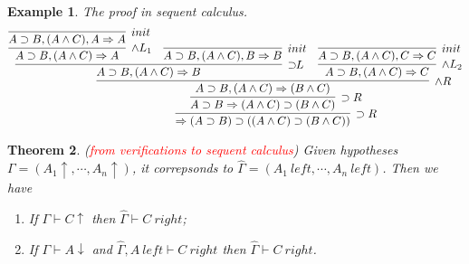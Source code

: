 \documentclass{article}
\theoremstyle{plain}
\newtheorem{theorem}{Theorem}
\newtheorem{example}[theorem]{Example}
\theoremstyle{nonumberplain}
\newcommand{\redt}[1]{\textcolor{red}{#1}}
\begin{document}
\begin{example}
\rm The proof in sequent calculus.
$$
\infer[\supset R]{\Rightarrow (A \supset B) \supset ((A\wedge C) \supset (B \wedge C) ) }{\infer[\supset R]{A \supset B \Rightarrow (A\wedge C) \supset (B \wedge C)}{\infer[\wedge R]{A \supset B,(A\wedge C) \Rightarrow  (B \wedge C)}{\infer[\supset\!\! L]{A \supset B,(A\wedge C) \Rightarrow B}{\infer[\wedge L_1]{A \supset B,(A\wedge C) \Rightarrow A}{\infer[init]{A \supset B,(A\wedge C), A \Rightarrow A}{}} & \infer[init]{A \supset B,(A\wedge C),B \Rightarrow B}{} } & \infer[\wedge L_2]{A \supset B,(A\wedge C) \Rightarrow C}{\infer[init]{A \supset B,(A\wedge C),C \Rightarrow C}{}}}}}
$$
\end{example}

\begin{theorem}
\rm (\redt{from verifications to sequent calculus}) Given hypotheses $\Gamma = (A_1 \uparrow, \cdots, A_n \uparrow)$, it correpsonds to $\widehat{\Gamma} = (A_1~left,\cdots,A_n~left)$. Then we have
\begin{enumerate}
\item If $\Gamma \vdash C \uparrow$ then $\widehat{\Gamma} \vdash C~right$;
	\item If $\Gamma \vdash A \downarrow$ and $\widehat{\Gamma} , A~left \vdash C~right$ then $\widehat{\Gamma} \vdash C~right$. 
\end{enumerate}
\end{theorem}
\end{document}
